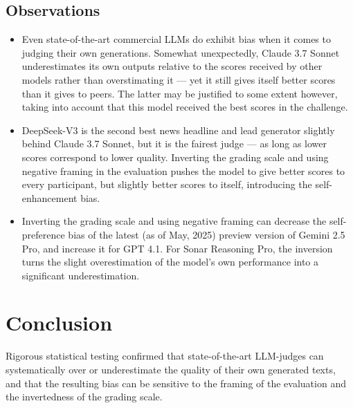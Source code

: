 \documentclass[UTF8,noindent,nohyp,parspace,titlepage,a4paper,12pt]{article}
\begin{document}
    \subsection{Observations}

      \begin{itemize}
        \item Even state-of-the-art commercial LLMs do exhibit bias when it
              comes to judging their own generations. Somewhat unexpectedly,
              Claude 3.7 Sonnet underestimates its own outputs relative to the
              scores received by other models rather than overstimating it ---
              yet it still gives itself better scores than it gives to peers.
              The latter may be justified to some extent however, taking into
              account that this model received the best scores in the
              challenge.

        \item DeepSeek-V3 is the second best news headline and lead generator
              slightly behind Claude 3.7 Sonnet, but it is the fairest judge
              --- as long as lower scores correspond to lower quality. Inverting
              the grading scale and using negative framing in the evaluation
              pushes the model to give better scores to every participant, but
              slightly better scores to itself, introducing the
              self-enhancement bias.

        \item Inverting the grading scale and using negative framing can
              decrease the self-preference bias of the latest (as of May, 2025)
              preview version of Gemini 2.5 Pro, and increase it for GPT 4.1.
              For Sonar Reasoning Pro, the inversion turns the slight
              overestimation of the model's own performance into a significant
              underestimation.
      \end{itemize}

\clearpage

  \section{Conclusion}

    Rigorous statistical testing confirmed that state-of-the-art LLM-judges can
    systematically over or underestimate the quality of their own generated
    texts, and that the resulting bias can be sensitive to the framing of the
    evaluation and the invertedness of the grading scale.
\end{document}
